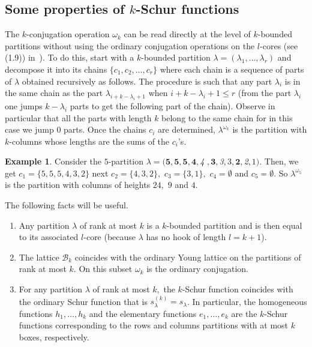 \documentclass[10pt,a4paper]{amsart}
\theoremstyle{definition}
\newtheorem{exam}[theorem]{Example}
\begin{document}
\subsection{Some properties of \texorpdfstring{$k$}{K}-Schur functions}

The $k$-conjugation operation $\omega_{k}$ can be read directly at the level
of $k$-bounded partitions without using the ordinary conjugation operations on
the $l$-cores (see (1.9)) in~\cite{LLMSSZ}). To do this, start with a
$k$-bounded partition $\lambda=(\lambda_{1},\ldots,\lambda_{r})$ and decompose
it into its chains $\{c_{1},c_{2},\ldots,c_{r}\}$ where each chain is a
sequence of parts of $\lambda$ obtained recursively as follows. The procedure
is such that any part $\lambda_{i}$ is in the same chain as the part
$\lambda_{i+k-\lambda_{i}+1}$ when $i+k-\lambda_{i}+1\leq r$ (from the part
$\lambda_{i}$ one jumps $k-\lambda_{i}$ parts to get the following part of the
chain). Observe in particular that all the parts with length $k$ belong to the
same chain for in this case we jump $0$ parts. Once the chains $c_{i}$ are
determined, $\lambda^{\omega_{k}}$ is the partition with $k$-columns whose
lengths are the sums of the $c_{i}$'s$.$

\begin{exam}
Consider the $5$-partition $\lambda=(\boldsymbol{5,5,5,4},$\emph{4}%
$,\boldsymbol{3},$\emph{3}$,3,\boldsymbol{2},$\emph{2}$,1)$. Then, we get
$c_{1}=\{5,5,5,4,3,2\}$ next $c_{2}=\{4,3,2\},$ $c_{3}=\{3,1\},$
$c_{4}=\emptyset$ and $c_{5}=\emptyset$. So $\lambda^{\omega_{5}}$ is the
partition with columns of heights $24,$ $9$ and $4$.
\end{exam}

The following facts will be useful.

\begin{enumerate}
\item Any partition $\lambda$ of rank at most $k$ is a $k$-bounded partition
and is then equal to its associated $l$-core (because $\lambda$ has no hook of
length $l=k+1$).

\item The lattice $\mathcal{B}_{k}$ coincides with the ordinary Young lattice
on the partitions of rank at most $k$. On this subset $\omega_{k}$ is the
ordinary conjugation.

\item For any partition $\lambda$ of rank at most $k,$ the $k$-Schur function
coincides with the ordinary Schur function that is $s_{\lambda}^{(k)}%
=s_{\lambda}$. In particular, the homogeneous functions $h_{1},\ldots,h_{k}$
and the elementary functions $e_{1},\ldots,e_{k}$ are the $k$-Schur functions
corresponding to the rows and columns partitions with at most $k$ boxes, respectively.
\end{enumerate}
\end{document}
